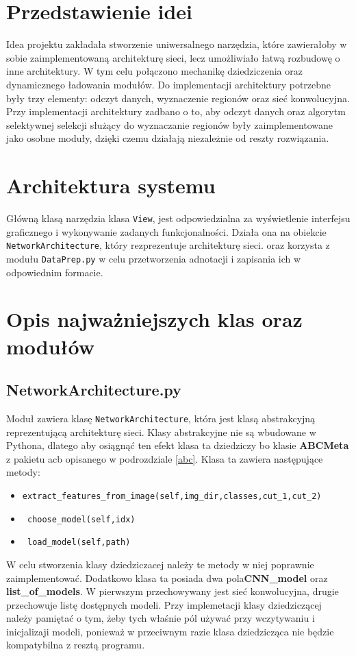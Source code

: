 \documentclass[a4paper,twoside,12pt]{book}
\begin{document}
{{\section{Przedstawienie idei}
{Idea projektu zakładała stworzenie uniwersalnego narzędzia, które zawierałoby w sobie zaimplementowaną architekturę sieci, lecz umożliwiało łatwą rozbudowę o inne architektury. W tym celu połączono mechanikę dziedziczenia oraz dynamicznego ładowania modułów. Do implementacji architektury potrzebne były trzy elementy: odczyt danych, wyznaczenie regionów oraz sieć konwolucyjna. Przy implementacji architektury zadbano o to, aby odczyt danych oraz algorytm selektywnej selekcji służący do wyznaczanie regionów były zaimplementowane jako osobne moduły, dzięki czemu działają niezależnie od reszty rozwiązania.}
\section{Architektura systemu}
{Główną klasą narzędzia klasa \lstinline|View|,  jest odpowiedzialna za wyświetlenie interfejsu graficznego i wykonywanie zadanych funkcjonalności. Działa ona na obiekcie \lstinline|NetworkArchitecture|, który rezprezentuje architekturę sieci. oraz korzysta z modułu \lstinline|DataPrep.py| w celu przetworzenia adnotacji i zapisania ich w odpowiednim formacie.}
\section{Opis najważniejszych klas oraz modułów}
\subsection{NetworkArchitecture.py}
{Moduł zawiera klasę \lstinline|NetworkArchitecture|, która jest klasą abstrakcyjną reprezentującą architekturę sieci. Klasy abstrakcyjne nie są wbudowane w Pythona, dlatego aby osiągnąć ten efekt klasa ta dziedziczy bo klasie \textbf{ABCMeta} z pakietu acb opisanego w podrozdziale \ref{abc}. Klasa ta zawiera następujące metody:}
\begin{itemize}
\item {\lstinline|extract_features_from_image(self,img_dir,classes,cut_1,cut_2)|}
\item{\lstinline| choose_model(self,idx)|}
\item{\lstinline| load_model(self,path)|}
\end{itemize}
{W celu stworzenia klasy dziedziczacej należy te metody w niej poprawnie zaimplementować. Dodatkowo klasa ta posiada dwa pola\textbf{CNN\_model} oraz \textbf{list\_of\_models}. W pierwszym przechowywany jest sieć konwolucyjna, drugie przechowuje listę dostępnych modeli. Przy implemetacji klasy dziedziczącej należy pamiętać o tym, żeby tych właśnie pól używać przy wczytywaniu i inicjalizaji modeli, ponieważ w przeciwnym razie klasa dziedzicząca nie będzie kompatybilna z resztą programu.}

}}
\end{document}
